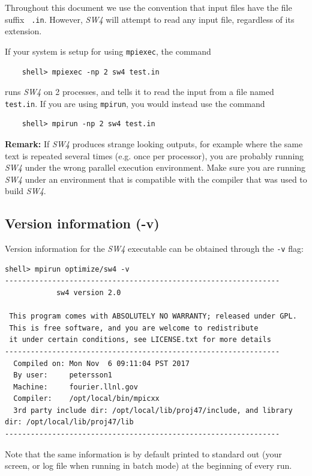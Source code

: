 \documentclass[11pt]{report}
\begin{document}
Throughout this document we use the convention that input files have the file suffix {\tt
		.in}. However, \emph{SW4} will attempt to read any input file, regardless of its extension.

If your system is setup for using \verb+mpiexec+, the command
\begin{verbatim}
	shell> mpiexec -np 2 sw4 test.in
\end{verbatim}
runs \emph{SW4} on 2 processes, and tells it to read the input from a file named {\tt test.in}.  If you
are using \verb+mpirun+, you would instead use the command
\begin{verbatim}
	shell> mpirun -np 2 sw4 test.in
\end{verbatim}
{\bf Remark: } If \emph{SW4} produces strange looking outputs, for example where the same text is
repeated several times (e.g. once per processor), you are probably running \emph{SW4} under the
wrong parallel execution environment. Make sure you are running \emph{SW4} under an environment that
is compatible with the compiler that was used to build \emph{SW4}.
%

\subsection{Version information (-v)}

Version information for the \emph{SW4} executable can be obtained through the {\tt -v} flag:
\begin{verbatim}
shell> mpirun optimize/sw4 -v
----------------------------------------------------------------
            sw4 version 2.0

 This program comes with ABSOLUTELY NO WARRANTY; released under GPL.
 This is free software, and you are welcome to redistribute     
 it under certain conditions, see LICENSE.txt for more details  
----------------------------------------------------------------
  Compiled on: Mon Nov  6 09:11:04 PST 2017
  By user:     petersson1
  Machine:     fourier.llnl.gov
  Compiler:    /opt/local/bin/mpicxx
  3rd party include dir: /opt/local/lib/proj47/include, and library dir: /opt/local/lib/proj47/lib
----------------------------------------------------------------
\end{verbatim}
Note that the same information is by default printed to standard out (your screen, or log file when
running in batch mode) at the beginning of every run.
\end{document}
